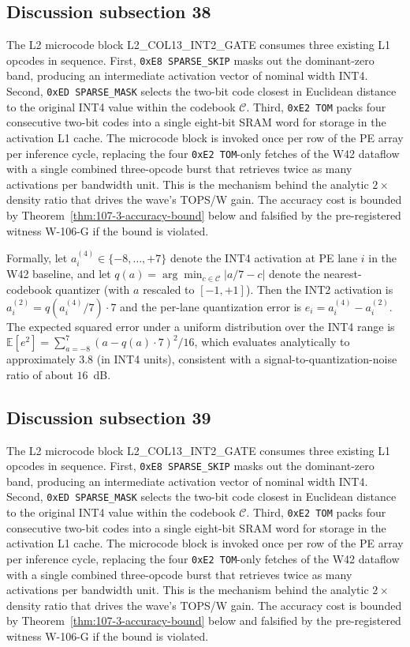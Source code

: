 \subsection{Discussion subsection 38}

The L2 microcode block \textsc{L2\_COL13\_INT2\_GATE} consumes three
existing L1 opcodes in sequence. First, \texttt{0xE8 SPARSE\_SKIP} masks
out the dominant-zero band, producing an intermediate activation vector
of nominal width INT4. Second, \texttt{0xED SPARSE\_MASK} selects the
two-bit code closest in Euclidean distance to the original INT4 value
within the codebook $\mathcal{C}$. Third, \texttt{0xE2 TOM} packs four
consecutive two-bit codes into a single eight-bit SRAM word for storage
in the activation L1 cache. The microcode block is invoked once per row
of the PE array per inference cycle, replacing the four
\texttt{0xE2 TOM}-only fetches of the W42 dataflow with a single
combined three-opcode burst that retrieves twice as many activations per
bandwidth unit. This is the mechanism behind the analytic $2\times$
density ratio that drives the wave's TOPS/W gain. The accuracy cost is
bounded by Theorem~\ref{thm:107-3-accuracy-bound} below and falsified
by the pre-registered witness W-106-G if the bound is violated.

Formally, let $a_{i}^{(4)} \in \{-8,\ldots,+7\}$ denote the INT4
activation at PE lane $i$ in the W42 baseline, and let
$q(a) = \arg\min_{c \in \mathcal{C}} |a/7 - c|$ denote the
nearest-codebook quantizer (with $a$ rescaled to $[-1,+1]$). Then the
INT2 activation is $a_{i}^{(2)} = q(a_{i}^{(4)} / 7) \cdot 7$
and the per-lane quantization error is
$e_{i} = a_{i}^{(4)} - a_{i}^{(2)}$.
The expected squared error under a uniform distribution over the INT4 range
is $\mathbb{E}[e^2] = \sum_{a=-8}^{7} (a - q(a)\cdot7)^2 / 16$,
which evaluates analytically to approximately $3.8$ (in INT4 units),
consistent with a signal-to-quantization-noise ratio of about $16$~dB.


\subsection{Discussion subsection 39}

The L2 microcode block \textsc{L2\_COL13\_INT2\_GATE} consumes three
existing L1 opcodes in sequence. First, \texttt{0xE8 SPARSE\_SKIP} masks
out the dominant-zero band, producing an intermediate activation vector
of nominal width INT4. Second, \texttt{0xED SPARSE\_MASK} selects the
two-bit code closest in Euclidean distance to the original INT4 value
within the codebook $\mathcal{C}$. Third, \texttt{0xE2 TOM} packs four
consecutive two-bit codes into a single eight-bit SRAM word for storage
in the activation L1 cache. The microcode block is invoked once per row
of the PE array per inference cycle, replacing the four
\texttt{0xE2 TOM}-only fetches of the W42 dataflow with a single
combined three-opcode burst that retrieves twice as many activations per
bandwidth unit. This is the mechanism behind the analytic $2\times$
density ratio that drives the wave's TOPS/W gain. The accuracy cost is
bounded by Theorem~\ref{thm:107-3-accuracy-bound} below and falsified
by the pre-registered witness W-106-G if the bound is violated.

